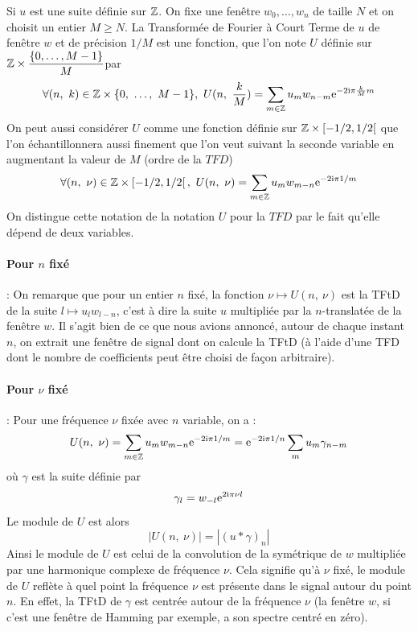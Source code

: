 Si $u$ est une suite d\'{e}finie sur $\mathbb{Z}$. On fixe une fen\^{e}tre $w_{0}, \ldots, w_{n}$ de taille
$N$ et on choisit un entier $M\geq N.$ La Transform\'{e}e de Fourier \`{a} Court Terme de $u$ de
fen\^{e}tre $w$ et de pr\'{e}cision $1/M$ est une fonction, que l'on note $U$ d\'{e}finie sur $\displaystyle \mathbb{Z}\times\frac{\{0,\ldots,M-1\}}{M}$par
$$
\forall(n,\ k)\in \zset\times\{0,\ \ldots,\ M-1\},\ U(n,\ \frac{k}{M})=\sum_{m\in \zset}u_{m}w_{n-m}\rme^{-2\rmi\pi \frac{k}{M}m}
$$
On peut aussi consid\'{e}rer $U$ comme une fonction d\'{e}finie sur $\displaystyle \mathbb{Z} \times \left[-1/2,1/2\right[$ que l'on \'{e}chantillonnera aussi finement que l'on veut suivant la seconde variable en augmentant la valeur de $M$ (ordre de la $TFD$)
$$
\forall(n,\ \nu)\in \mathbb{Z}\times \left[-1/2,1/2\right[,\ U(n,\ \nu)=\sum_{m\in \mathbb{Z}}u_{m}w_{m-n}\mathrm{e}^{-2\mathrm{i}\pi  1/m}
$$
On distingue cette notation de la notation $U$ pour la $TFD$ par le fait qu'elle dépend de deux variables.

\paragraph{Pour $n$ fix\'{e}}: On remarque que pour un entier $n$ fix\'{e}, la fonction $\nu\mapsto U(n,\ \nu)$ est la TFtD de la suite $l\mapsto u_{l}w_{l-n}$, c'est \`{a} dire la suite $u$ multipli\'{e}e par la $n$-translat\'{e}e de la fen\^{e}tre $w$. Il s'agit bien de ce que nous avions annonc\'{e}, autour de chaque instant $n$, on extrait une fenêtre de signal dont on calcule la TFtD (à l'aide d'une TFD dont le nombre de coefficients peut être choisi de façon arbitraire).

\paragraph{Pour $\nu$ fix\'{e}}: Pour une fr\'{e}quence $\nu$ fix\'{e}e avec $n$ variable, on a :
$$
U(n,\ \nu)=\sum_{m\in \mathbb{Z}}u_{m}w_{m-n}\mathrm{e}^{-2\mathrm{i}\pi  1/m}=\mathrm{e}^{-2\mathrm{i}\pi  1/n}\sum_{m}u_{m}\gamma_{n-m}
$$
o\`{u} $\gamma$ est la suite d\'{e}finie par
$$
\gamma_{l}=w_{-l} \mathrm{e}^{2 \mathrm{i}\pi \nu l}
$$
Le module de $U$ est alors
$$
|U(n,\ \nu)|=|(u*\gamma)_{n}|
$$
Ainsi le module de $U$ est celui de la convolution de la sym\'{e}trique de $w$ multipli\'{e}e par une harmonique complexe  de fr\'{e}quence $\nu$. Cela signifie qu'\`{a} $\nu$ fix\'{e}, le module de $U$ refl\`{e}te \`{a} quel point la fr\'{e}quence $\nu$ est pr\'{e}sente dans le signal autour du point $n$. En effet, la TFtD de $\gamma$ est centr\'{e}e autour de la fr\'{e}quence $\nu$ (la fen\^{e}tre $w$, si c'est une fen\^{e}tre de Hamming par exemple, a son spectre centr\'{e} en z\'{e}ro).


